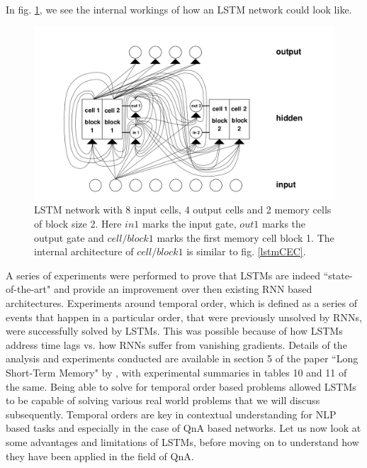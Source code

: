 \documentclass[12pt]{report}
\begin{document}
            In fig. \ref{lstmNetwork}, we see the internal workings of how an LSTM network could look like.
            \begin{figure}[!h]
	           \centering
               \includegraphics[scale=0.35]{../images/lstm-network.png}
      		   \caption{LSTM network with 8 input cells, 4 output cells and 2 memory cells of block size 2. Here $ in1 $ marks the input gate, $ out1 $ marks the output gate and $ cell/block1 $ marks the first memory cell block 1. The internal architecture of $ cell/block1 $ is similar to fig. \ref{lstmCEC}. \citep{lstmoriginal}}\label{lstmNetwork}
            \end{figure}

            A series of experiments were performed to prove that LSTMs are indeed ``state-of-the-art" and provide an improvement over then existing RNN based architectures.
            Experiments around temporal order, which is defined as a series of events that happen in a particular order, that were previously unsolved by RNNs, were successfully solved by LSTMs. This was possible because of how LSTMs address time lags vs. how RNNs suffer from vanishing gradients. Details of the analysis and experiments conducted are available in section 5 of the paper ``Long Short-Term Memory" by \cite{lstmoriginal}, with experimental summaries in tables 10 and 11 of the same. Being able to solve for temporal order based problems allowed LSTMs to be capable of solving various real world problems that we will discuss subsequently.
            Temporal orders are key in contextual understanding for NLP based tasks and especially in the case of QnA based networks. Let us now look at some advantages and limitations of LSTMs, before moving on to understand how they have been applied in the field of QnA.
\end{document}
